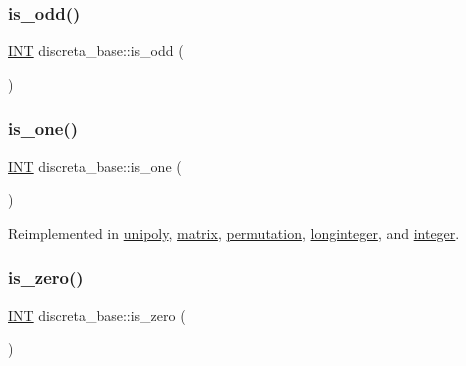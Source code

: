 \mbox{\label{classdiscreta__base_a4fc6a621844c78d4199639ba394c31eb}} 
\subsubsection{\texorpdfstring{is\+\_\+odd()}{is\_odd()}}
{\footnotesize\ttfamily \mbox{\hyperlink{galois_8h_a09fddde158a3a20bd2dcadb609de11dc}{I\+NT}} discreta\+\_\+base\+::is\+\_\+odd (\begin{DoxyParamCaption}{ }\end{DoxyParamCaption})}

\mbox{\label{classdiscreta__base_a28fa37aac83194174888d34f07f43848}} 
\subsubsection{\texorpdfstring{is\+\_\+one()}{is\_one()}}
{\footnotesize\ttfamily \mbox{\hyperlink{galois_8h_a09fddde158a3a20bd2dcadb609de11dc}{I\+NT}} discreta\+\_\+base\+::is\+\_\+one (\begin{DoxyParamCaption}{ }\end{DoxyParamCaption})\hspace{0.3cm}{\ttfamily [virtual]}}



Reimplemented in \mbox{\hyperlink{classunipoly_a1840dc8eb1a17b1764b108c96299738d}{unipoly}}, \mbox{\hyperlink{classmatrix_a74aa38df064afa998cb0973ac3554ac0}{matrix}}, \mbox{\hyperlink{classpermutation_ac86938f55c0b8af01d1f22c813310b97}{permutation}}, \mbox{\hyperlink{classlonginteger_a2e169e4ac876ac8694af28468fdfd060}{longinteger}}, and \mbox{\hyperlink{classinteger_acf8faabd4ed20f9580605714b5b73a5f}{integer}}.

\mbox{\label{classdiscreta__base_ac75f6bdc1ba1b406e26cf921adfd9864}} 
\subsubsection{\texorpdfstring{is\+\_\+zero()}{is\_zero()}}
{\footnotesize\ttfamily \mbox{\hyperlink{galois_8h_a09fddde158a3a20bd2dcadb609de11dc}{I\+NT}} discreta\+\_\+base\+::is\+\_\+zero (\begin{DoxyParamCaption}{ }\end{DoxyParamCaption})\hspace{0.3cm}{\ttfamily [virtual]}}




